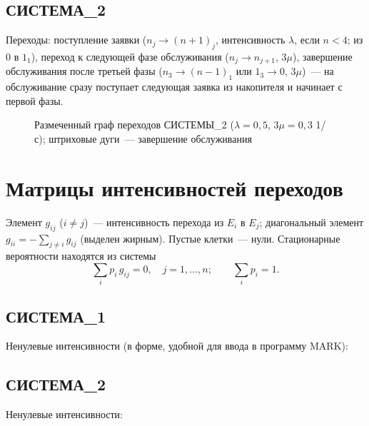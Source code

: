 \documentclass[12pt,a4paper]{article}
\begin{document}
\subsection{СИСТЕМА\_2}
Переходы: поступление заявки ($n_j \to (n+1)_j$, интенсивность $\lambda$, если $n<4$; из $0$ в $1_1$),
переход к следующей фазе обслуживания ($n_j \to n_{j+1}$, $3\mu$), завершение обслуживания после третьей
фазы ($n_3 \to (n-1)_1$ или $1_3 \to 0$, $3\mu$)~--- на обслуживание сразу поступает следующая заявка из накопителя
и начинает с первой фазы.
\begin{figure}[H]
\centering
\resizebox{0.85\textwidth}{!}{\graphTwo}
\caption{Размеченный граф переходов СИСТЕМЫ\_2 ($\lambda=0{,}5$, $3\mu=0{,}3$ 1/с); штриховые дуги~--- завершение обслуживания}
\end{figure}

\section{Матрицы интенсивностей переходов}
Элемент $g_{ij}$ ($i\ne j$)~--- интенсивность перехода из $E_i$ в $E_j$; диагональный элемент
$g_{ii} = -\sum_{j\ne i} g_{ij}$ (выделен жирным). Пустые клетки~--- нули.
Стационарные вероятности находятся из системы
\[
\sum_{i} p_i\, g_{ij} = 0,\quad j=1,\dots,n; \qquad \sum_i p_i = 1 .
\]

\subsection{СИСТЕМА\_1}
\begin{table}[H]
\centering
\caption{Матрица интенсивностей переходов $G_1$ (16$\times$16)}
\setlength{\tabcolsep}{1.2pt}
\resizebox{\textwidth}{!}{\tiny}
\end{table}
Ненулевые интенсивности (в форме, удобной для ввода в программу MARK):


\subsection{СИСТЕМА\_2}
\begin{table}[H]
\centering
\caption{Матрица интенсивностей переходов $G_2$ (13$\times$13)}
\setlength{\tabcolsep}{2pt}
\resizebox{\textwidth}{!}{\scriptsize}
\end{table}
Ненулевые интенсивности:


\end{document}
